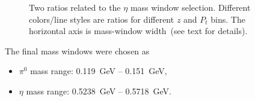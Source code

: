 \begin{figure}
\centering     %
{}
\caption[Two ratios of signal and background yields related to the $\eta$ mass window selection]{Two ratios related to  the $\eta$ mass window selection. Different colors/line styles are ratios for different $z$ and $P_t$ bins. The horizontal axis is mass-window width~(see text for details).}
\label{fig:etaS}
\end{figure}
The final mass windows were chosen as
\begin{itemize}
\item $\pi^0$ mass range: 0.119~GeV -- 0.151~GeV,
\item $\eta$ mass range: 0.5238~GeV -- 0.5718~GeV.
\end{itemize}
